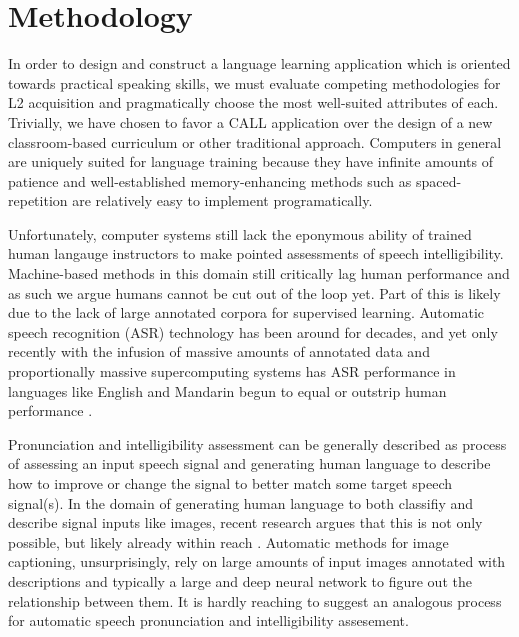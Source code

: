 \section{Methodology} 
In order to design and construct a language learning application which is oriented towards practical speaking skills, we must evaluate competing methodologies for L2 acquisition and pragmatically choose the most well-suited attributes of each. Trivially, we have chosen to favor a CALL application over the design of a new classroom-based curriculum or other traditional approach. Computers in general are uniquely suited for language training because they have infinite amounts of patience and well-established memory-enhancing methods such as spaced-repetition \cite{glanzer1971repetition} \cite{wozniak2007supermemo} \cite{wozniak1990supermemo} \cite{cuddy1982forgetting} are relatively easy to implement programatically. 

Unfortunately, computer systems still lack the eponymous ability of trained human langauge instructors to make pointed assessments of speech intelligibility. Machine-based methods in this domain still critically lag human performance and as such we argue humans cannot be cut out of the loop yet. Part of this is likely due to the lack of large annotated corpora for supervised learning. Automatic speech recognition (ASR) technology has been around for decades, and yet only recently with the infusion of massive amounts of annotated data and proportionally massive supercomputing systems has ASR performance in languages like English and Mandarin begun to equal or outstrip human performance \cite{hannun2014deep} \cite{hinton2012deep} \cite{chan2016listen}. 

Pronunciation and intelligibility assessment can be generally described as process of assessing an input speech signal and generating human language to describe how to improve or change the signal to better match some target speech signal(s). In the domain of generating human language to both classifiy and describe signal inputs like images, recent research argues that this is not only possible, but likely already within reach \cite{reed2016learning} \cite{tran2016rich}. Automatic methods for image captioning, unsurprisingly, rely on large amounts of input images annotated with descriptions and typically a large and deep neural network to figure out the relationship between them. It is hardly reaching to suggest an analogous process for automatic speech pronunciation and intelligibility assesement. 

